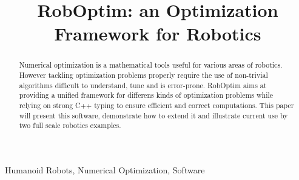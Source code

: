 \documentclass[conference,final,a4paper,twocolumn,9pt]{IEEEtran}
\begin{document}
\title{RobOptim: an Optimization Framework for Robotics}

\author{
\and
{}
\and
{}
\and
{}
}

\maketitle

\begin{abstract}
\boldmath Numerical optimization is a mathematical tools useful for
various areas of robotics. However tackling optimization problems
properly require the use of non-trivial algorithms difficult to
understand, tune and is error-prone. RobOptim aims at providing a
unified framework for differens kinds of optimization problems while
relying on strong C++ typing to ensure efficient and correct
computations. This paper will present this software, demonstrate how
to extend it and illustrate current use by two full scale robotics
examples.
\end{abstract}

\begin{IEEEkeywords}
  Humanoid Robots, Numerical Optimization, Software
\end{IEEEkeywords}

\IEEEpeerreviewmaketitle
\end{document}
